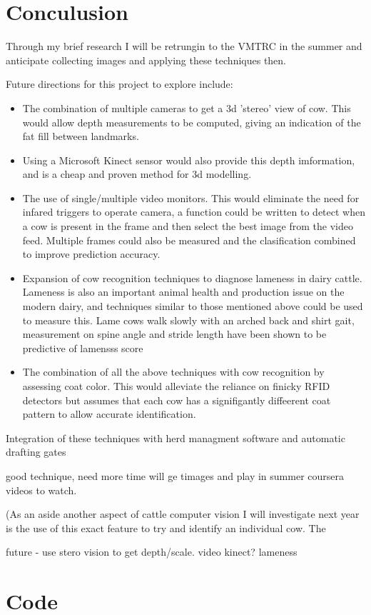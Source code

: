 \documentclass[11pt]{article}
\begin{document}
\section{Conculusion}
	Through my brief research 
	I will be retrungin to the VMTRC in the summer and anticipate collecting images and applying these techniques then.

	Future directions for this project to explore include:
	\begin{itemize}
		\item The combination of multiple cameras to get a 3d 'stereo' view of cow. This would allow depth measurements to be computed, giving an indication of the fat fill between landmarks.
		\item Using a Microsoft Kinect sensor would also provide this depth imformation, and is a cheap and proven method for 3d modelling.
		\item The use of single/multiple video monitors. This would eliminate the need for infared triggers to operate camera, a function could be written to detect when a cow is present in the frame and then select the best image from the video feed. Multiple frames could also be measured and the clasification combined to improve prediction accuracy.
		\item Expansion of cow recognition techniques to diagnose lameness in dairy cattle. Lameness is also an important animal health and production issue on the modern dairy, and techniques similar to those mentioned above could be used to measure this.
			Lame cows walk slowly with an arched back and shirt gait, measurement on spine angle and stride length have been shown to be predictive of lamensss score\cite{Viazzi2013,Pluk2012}
		\item The combination of all the above techniques with cow recognition by assessing coat color. This would alleviate the reliance on finicky RFID detectors but assumes that each cow has a signifigantly diffeerent coat pattern to allow accurate identification.
	\end{itemize}

	Integration of these techniques with herd managment software and automatic drafting gates 


	good technique, need more time
	will ge timages and play in summer
	coursera videos to watch.

	(As an aside another aspect of cattle computer vision I will investigate next year is the use of this exact feature to try and identify an individual cow. The 

	future - use stero vision to get depth/scale.
		video
		kinect?
		lameness

\section{Code}
	



\end{document}
